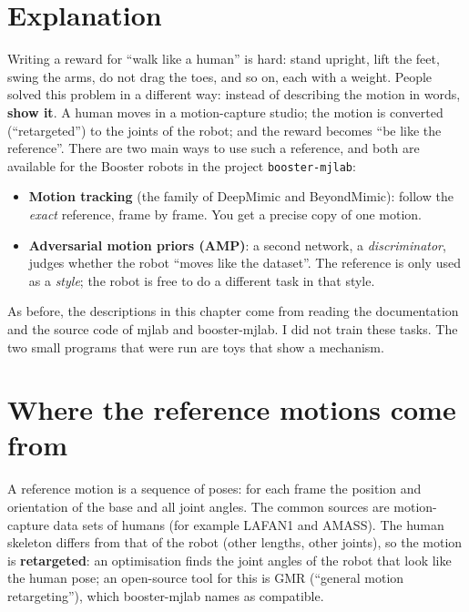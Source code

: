 \label{ch:mj3}

\section*{Explanation}
Writing a reward for ``walk like a human'' is hard: stand upright, lift the feet, swing the arms, do not drag the toes, and so on, each with a weight. People solved this problem in a different way: instead of describing the motion in words, \textbf{show it}. A human moves in a motion-capture studio; the motion is converted (``retargeted'') to the joints of the robot; and the reward becomes ``be like the reference''. There are two main ways to use such a reference, and both are available for the Booster robots in the project \texttt{booster-mjlab}:
\begin{itemize}[nosep]
 \item \textbf{Motion tracking} (the family of DeepMimic and BeyondMimic): follow the \emph{exact} reference, frame by frame. You get a precise copy of one motion.
 \item \textbf{Adversarial motion priors (AMP)}: a second network, a \emph{discriminator}, judges whether the robot ``moves like the dataset''. The reference is only used as a \emph{style}; the robot is free to do a different task in that style.
\end{itemize}
As before, the descriptions in this chapter come from reading the documentation and the source code of mjlab and booster-mjlab. I did not train these tasks. The two small programs that were run are toys that show a mechanism.

\section*{Where the reference motions come from}
A reference motion is a sequence of poses: for each frame the position and orientation of the base and all joint angles. The common sources are motion-capture data sets of humans (for example LAFAN1 and AMASS). The human skeleton differs from that of the robot (other lengths, other joints), so the motion is \textbf{retargeted}: an optimisation finds the joint angles of the robot that look like the human pose; an open-source tool for this is GMR (``general motion retargeting''), which booster-mjlab names as compatible.

